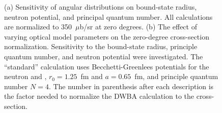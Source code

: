 \begin{figure}[!htbp]
\centering
{}
\caption[Sensitivity of angular distributions and zero-degree cross sections to bound-state and neutron optical model parameters.]{(a) Sensitivity of angular distributions on bound-state radius, neutron potential, and principal quantum number.  All calculations are normalized to 350~$\mu$b/sr at zero degrees. (b) The effect of varying optical model parameters on the zero-degree cross-section normalization.  Sensitivity to the bound-state radius, principle quantum number, and neutron potential were investigated.  The ``standard'' calculation uses Becchetti-Greenlees potentials for the neutron and , $r_0=1.25$~fm and $a=0.65$~fm, and principle quantum number $N=4$.  The number in parenthesis after each description is the factor needed to normalize the DWBA calculation to the  cross-section.}
\label{fig:varyParam}
\end{figure}
 
